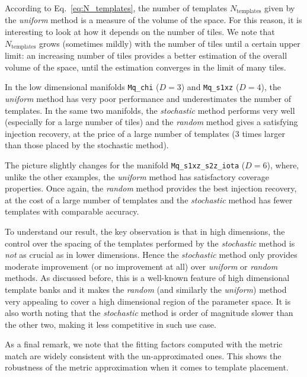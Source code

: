 \documentclass[twocolumn,showpacs,preprintnumbers,nofootinbib,prd,
superscriptaddress,10pt]{revtex4-2}
\begin{document}
According to Eq.~\eqref{eq:N_templates}, the number of templates $N_{\text{templates}}$ given by the {\it uniform} method is a measure of the volume of the space. For this reason, it is interesting to look at how it depends on the number of tiles.
We note that $N_{\text{templates}}$ grows (sometimes mildly) with the number of tiles until a certain upper limit: an increasing number of tiles provides a better estimation of the overall volume of the space, until the estimation converges in the limit of many tiles. 

In the low dimensional manifolds \texttt{Mq\_chi} ($D=3$) and \texttt{Mq\_s1xz} ($D=4$), the {\it uniform} method has very poor performance and underestimates the number of templates. In the same two manifolds, the {\it stochastic} method performs very well (especially for a large number of tiles) and the {\it random} method gives a satisfying injection recovery, at the price of a large number of templates (3 times larger than those placed by the stochastic method).

The picture slightly changes for the manifold \texttt{Mq\_s1xz\_s2z\_iota} ($D=6$), where, unlike the other examples, the {\it uniform} method has satisfactory coverage properties.
Once again, the {\it random} method provides the best injection recovery, at the cost of a large number of templates and the {\it stochastic} method has fewer templates with comparable accuracy.

To understand our result, the key observation is that in high dimensions, the control over the spacing of the templates performed by the {\it stochastic} method is {\it not} as crucial as in lower dimensions. Hence the {\it stochastic} method only provides moderate improvement (or no improvement at all) over {\it uniform} or {\it random} methods. As discussed before, this is a well-known feature \cite{Messenger:2008ta, Allen:2021yuy, Allen:2022lqr} of high dimensional template banks and it makes the {\it random} (and similarly the {\it uniform}) method very appealing to cover a high dimensional region of the parameter space.
It is also worth noting that the {\it stochastic} method is order of magnitude slower than the other two, making it less competitive in such use case.

As a final remark, we note that the fitting factors computed with the metric match are widely consistent with the un-approximated ones. This shows the robustness of the metric approximation when it comes to template placement.
\end{document}
